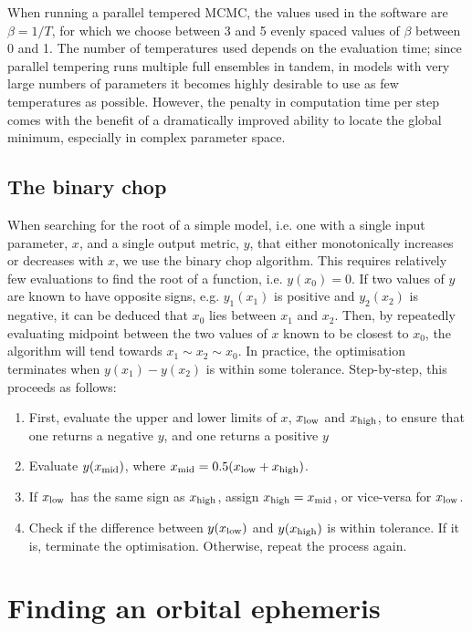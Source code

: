 When running a parallel tempered MCMC, the values used in the software are $\beta = 1/T$, for which we choose between 3 and 5 evenly spaced values of $\beta$ between 0 and 1.
The number of temperatures used depends on the evaluation time; since parallel tempering runs multiple full ensembles in tandem, in models with very large numbers of parameters it becomes highly desirable to use as few temperatures as possible. However, the penalty in computation time per step comes with the benefit of a dramatically improved ability to locate the global minimum, especially in complex parameter space.

\subsection{The binary chop}

When searching for the root of a simple model, i.e. one with a single input parameter, $x$, and a single output metric, $y$, that either monotonically increases or decreases with $x$, we use the binary chop algorithm.
This requires relatively few evaluations to find the root of a function, i.e. $y(x_0) = 0$.
If two values of $y$ are known to have opposite signs, e.g. $y_1(x_1)$ is positive and $y_2(x_2)$ is negative, it can be deduced that $x_0$ lies between $x_1$ and $x_2$. Then, by repeatedly evaluating midpoint between the two values of $x$ known to be closest to $x_0$, the algorithm will tend towards $x_1 \sim x_2 \sim x_0$. In practice, the optimisation terminates when $y(x_1) - y(x_2)$ is within some tolerance.
Step-by-step, this proceeds as follows:
\begin{enumerate}
    \setlength\itemsep{0em}
    \item First, evaluate the upper and lower limits of $x$, $x_{\rm low}$ and $x_{\rm high}$, to ensure that one returns a negative $y$, and one returns a positive $y$
    \item Evaluate $y(x_{\rm mid})$, where $x_{\rm mid} = 0.5(x_{\rm low} + x_{\rm high})$.
    \item If $x_{\rm low}$ has the same sign as $x_{\rm high}$, assign $x_{\rm high} = x_{\rm mid}$, or vice-versa for $x_{\rm low}$.
    \item Check if the difference between $y(x_{\rm low})$ and $y(x_{\rm high})$ is within tolerance. If it is, terminate the optimisation. Otherwise, repeat the process again.
\end{enumerate}


\section{Finding an orbital ephemeris}
\label{sect:modelling:getting ephemeris}

